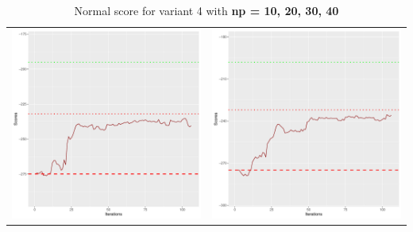 \documentclass[]{scrartcl}
\begin{document}
\begin{table}[h!]
\begin{tabular}{cc}
\includegraphics[scale = 0.4]{./figs/asia/v4/30/boundsEvolution-107.pdf} & 
\includegraphics[scale = 0.4]{./figs/asia/v4/40/boundsEvolution-107.pdf} \\
\end{tabular}
\caption{Normal score for variant 4 with \textbf{np =  10, 20, 30, 40}}
\end{table}
\end{document}
